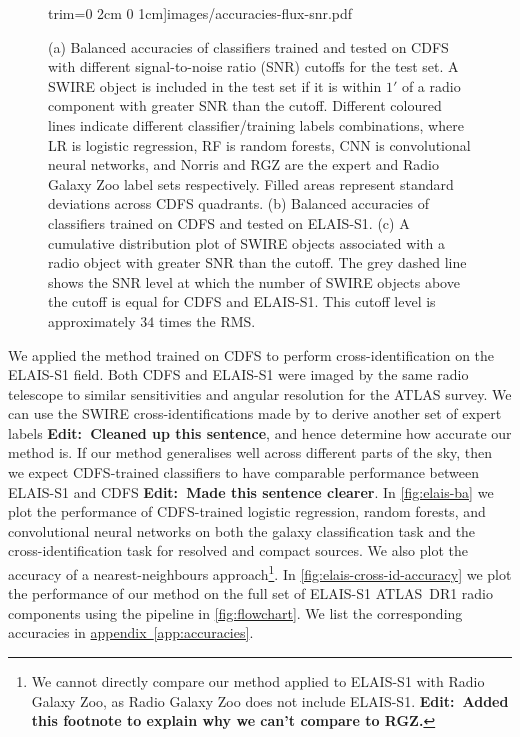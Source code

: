 \documentclass[fleqn,usenatbib,usedcolumn]{mnras}
\newcommand{\edit}[1]{{\bf Edit:~{#1}}}
\newcommand{\aref}[1]{\hyperref[#1]{appendix~\ref{#1}}}
\begin{document}
\begin{figure}
                     trim={0 2cm 0 1cm}]{images/accuracies-flux-snr.pdf}
    \caption{(a) Balanced accuracies of classifiers trained and tested on CDFS
      with different signal-to-noise ratio (SNR) cutoffs for the test set. A
      SWIRE object is included in the test set if it is within $1'$ of a radio
      component with greater SNR than the cutoff. Different coloured lines
      indicate different classifier/training labels combinations, where LR is
      logistic regression, RF is random forests, CNN is convolutional neural
      networks, and Norris and RGZ are the expert and Radio Galaxy Zoo label
      sets respectively. Filled areas represent standard deviations across
      CDFS quadrants. (b) Balanced accuracies of classifiers trained on CDFS
      and tested on ELAIS-S1. (c) A cumulative distribution plot of SWIRE
      objects associated with a radio object with greater SNR than the cutoff.
      The grey dashed line shows the SNR level at which the number of SWIRE
      objects above the cutoff is equal for CDFS and ELAIS-S1. This cutoff level
      is approximately $34$ times the RMS.}
    \label{fig:accuracies-flux}
  \end{figure}

  We applied the method trained on CDFS to perform cross-identification on the ELAIS-S1 field. Both CDFS and ELAIS-S1 were imaged by the same radio telescope to similar sensitivities and angular resolution for the ATLAS survey. We can use the SWIRE cross-identifications made by \citet{middelberg08} to derive another set of expert labels \edit{Cleaned up this sentence}, and hence determine how accurate our method is. If our method generalises well across different parts of the sky, then we expect CDFS-trained classifiers to have comparable performance between ELAIS-S1 and CDFS \edit{Made this sentence clearer}. In \autoref{fig:elais-ba} we plot the performance of CDFS-trained logistic regression, random forests, and convolutional neural networks on both the galaxy classification task and the cross-identification task for resolved and compact sources. We also plot the accuracy of a nearest-neighbours approach\footnote{We cannot directly compare our method applied to ELAIS-S1 with Radio Galaxy Zoo, as Radio Galaxy Zoo does not include ELAIS-S1. \edit{Added this footnote to explain why we can't compare to RGZ.}}. In \autoref{fig:elais-cross-id-accuracy} we plot the performance of our method on the full set of ELAIS-S1 ATLAS~DR1 radio components using the pipeline in \autoref{fig:flowchart}. We list the corresponding accuracies in \aref{app:accuracies}.
\end{document}
